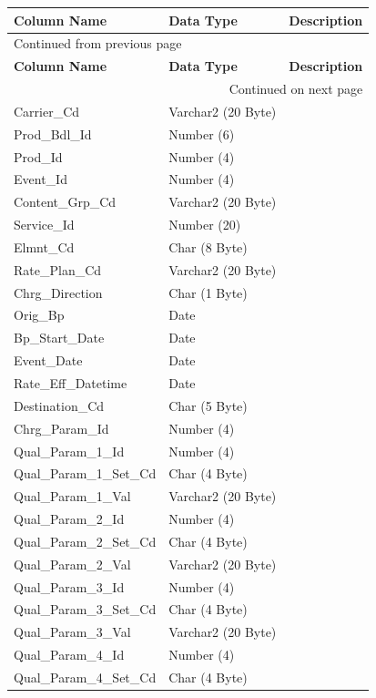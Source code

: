 \documentclass[12pt,twoside]{article}
\begin{document}
\begin{longtable}{l|l|l}
\hline
\textbf{Column Name} & \textbf{Data Type} & \textbf{Description}\\
\hline
\endfirsthead
\multicolumn{3}{l}{Continued from previous page} \\
\hline

\textbf{Column Name} & \textbf{Data Type} & \textbf{Description} \\

\hline
\endhead
\hline\multicolumn{3}{r}{Continued on next page} \\
\endfoot
\endlastfoot
\hline
Carrier\_Cd & Varchar2 (20 Byte) & \\
Prod\_Bdl\_Id & Number (6) & \\
Prod\_Id & Number (4) & \\
Event\_Id & Number (4) & \\
Content\_Grp\_Cd & Varchar2 (20 Byte) & \\
Service\_Id & Number (20) & \\
Elmnt\_Cd & Char (8 Byte) & \\
Rate\_Plan\_Cd & Varchar2 (20 Byte) & \\
Chrg\_Direction & Char (1 Byte) & \\
Orig\_Bp & Date & \\
Bp\_Start\_Date & Date & \\
Event\_Date & Date & \\
Rate\_Eff\_Datetime & Date & \\
Destination\_Cd & Char (5 Byte) & \\
Chrg\_Param\_Id & Number (4) & \\
Qual\_Param\_1\_Id & Number (4) & \\
Qual\_Param\_1\_Set\_Cd & Char (4 Byte) & \\
Qual\_Param\_1\_Val & Varchar2 (20 Byte) & \\
Qual\_Param\_2\_Id & Number (4) & \\
Qual\_Param\_2\_Set\_Cd & Char (4 Byte) & \\
Qual\_Param\_2\_Val & Varchar2 (20 Byte) & \\
Qual\_Param\_3\_Id & Number (4) & \\
Qual\_Param\_3\_Set\_Cd & Char (4 Byte) & \\
Qual\_Param\_3\_Val & Varchar2 (20 Byte) & \\
Qual\_Param\_4\_Id & Number (4) & \\
Qual\_Param\_4\_Set\_Cd & Char (4 Byte) & \\

\end{longtable}
\end{document}
